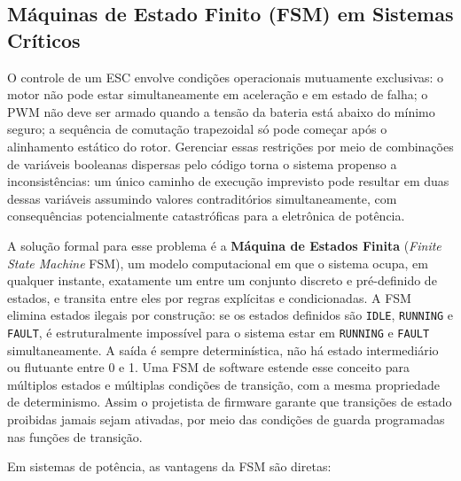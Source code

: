 \subsection{Máquinas de Estado Finito (FSM) em Sistemas Críticos}

O controle de um ESC envolve condições operacionais mutuamente exclusivas: o motor não pode estar simultaneamente em aceleração e em estado de falha; o PWM não deve ser armado quando a tensão da bateria está abaixo do mínimo seguro; a sequência de comutação trapezoidal só pode começar após o alinhamento estático do rotor. Gerenciar essas restrições por meio de combinações de variáveis booleanas dispersas pelo código torna o sistema propenso a inconsistências: um único caminho de execução imprevisto pode resultar em duas dessas variáveis assumindo valores contraditórios simultaneamente, com consequências potencialmente catastróficas para a eletrônica de potência.

A solução formal para esse problema é a \textbf{Máquina de Estados Finita} (\textit{Finite State Machine} FSM), um modelo computacional em que o sistema ocupa, em qualquer instante, exatamente um entre um conjunto discreto e pré-definido de estados, e transita entre eles por regras explícitas e condicionadas. A FSM elimina estados ilegais por construção: se os estados definidos são \texttt{IDLE}, \texttt{RUNNING} e \texttt{FAULT}, é estruturalmente impossível para o sistema estar em \texttt{RUNNING} e \texttt{FAULT} simultaneamente. A saída é sempre determinística, não há estado intermediário ou flutuante entre 0 e 1. Uma FSM de software estende esse conceito para múltiplos estados e múltiplas condições de transição, com a mesma propriedade de determinismo. Assim o projetista de firmware garante que transições de estado proibidas jamais sejam ativadas, por meio das condições de guarda programadas nas funções de transição.

Em sistemas de potência, as vantagens da FSM são diretas:

